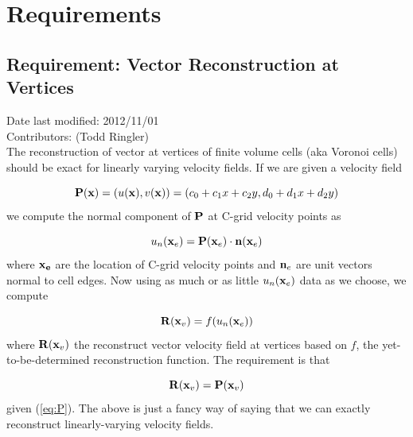 \documentclass[11pt]{report}
\begin{document}





\chapter{Requirements}

\section{Requirement: Vector Reconstruction at Vertices}
\label{Sec:Reconstruct}
Date last modified: 2012/11/01 \\
Contributors: (Todd Ringler) \\

The reconstruction of vector at vertices of finite volume cells (aka Voronoi cells) should be exact for linearly varying velocity fields. If we are given a velocity field

\begin{equation}
\label{eq:P}
{\bf P}({\bf x}) = (u({\bf x}),v({\bf x})) = (c_0 + c_1 x + c_2 y, d_0 + d_1 x + d_2 y)
\end{equation}
we compute the normal component of ${\bf P}$ at C-grid velocity points as

\begin{equation}
u_n({\bf x}_e) = {\bf P}({\bf x}_e) \cdot {\bf n}({\bf x}_e)
\end{equation}
where ${\bf x_e}$ are the location of C-grid velocity points and ${\bf n}_e$ are unit vectors normal to cell edges. Now using as much or as little $u_n({\bf x}_e)$ data as we choose, we compute

\begin{equation}
{\bf R}({\bf x}_v) = f(u_n({\bf x}_e))
\end{equation}
where ${\bf R}({\bf x}_v)$ the reconstruct vector velocity field at vertices based on $f$, the yet-to-be-determined reconstruction function. The requirement is that

\begin{equation}
{\bf R}({\bf x}_v) = {\bf P}({\bf x}_v)
\end{equation}
given (\ref{eq:P}). The above is just a fancy way of saying that we can exactly reconstruct linearly-varying velocity fields.
\end{document}
